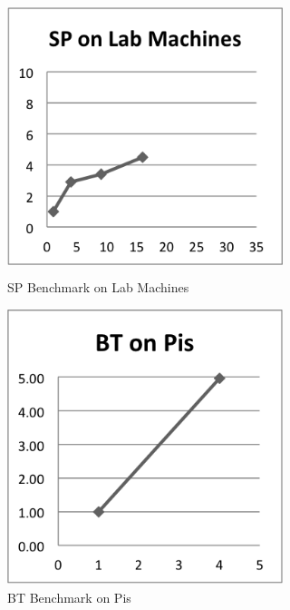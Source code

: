 \documentclass{acm_proc_article-sp}
\begin{document}
\begin{figure}[tbp]
  \centering
  \caption{SP Benchmark on Lab Machines}
	\label{LabSP}
  \includegraphics[width=19pc, height=19pc]{Pics-Lab/SP.png}
\end{figure}

\clearpage


\begin{figure}[tbp]
  \centering
  \caption{BT Benchmark on Pis}
	\label{PiBT}
  \includegraphics[width=19pc, height=19pc]{Pics-Pi/BT.png}
\end{figure}
\end{document}
